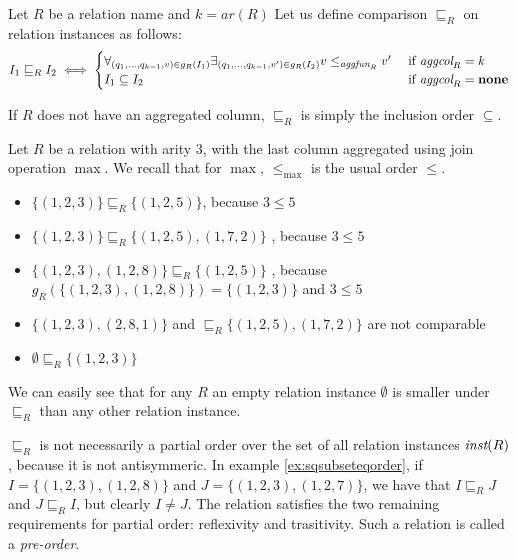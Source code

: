 \begin{defn}
Let $R$ be a relation name and $k=ar(R)$ Let us define comparison $\sqsubseteq_R$ on relation instances as follows:
$$
I_1 \sqsubseteq_R I_2 \iff
\begin{cases}
   \forall_{(q_1, ..., q_{k-1}, v) \in g_R(I_1)} \exists_{(q_1, ..., q_{k-1}, v') \in g_R(I_2)} v \le_{\textit{aggfun}_R} v' & \text{ if } \textit{aggcol}_R = k \\
   I_1 \subseteq I_2 & \text{ if } \textit{aggcol}_R = \bf{none} 
\end{cases}
$$
\end{defn}

\begin{rem}
If $R$ does not have an aggregated column, $\sqsubseteq_R$ is simply the inclusion order $\subseteq$. 
\end{rem}


\begin{exmp}
Let $R$ be a relation with arity $3$, with the last column aggregated using join operation $\max$.
We recall that for $ \max $, $ \le_{\max} $ is the usual order $ \le $.
\begin{itemize}
\item $\{(1, 2, 3)\} \sqsubseteq_R \{(1, 2, 5)\}$, because $3 \le 5$
\item $\{(1, 2, 3)\} \sqsubseteq_R \{(1, 2, 5), (1, 7, 2)\}$ , because $3 \le 5$
\item $\{(1, 2, 3), (1, 2, 8)\} \sqsubseteq_R \{(1, 2, 5)\}$ , because $g_R(\{(1, 2, 3), (1, 2, 8)\}) = \{(1,2,3)\}$ and $3 \le 5$
\item $\{(1, 2, 3), (2, 8, 1)\}$ and  $\sqsubseteq_R \{(1, 2, 5), (1, 7, 2)\}$ are not comparable
\item $\emptyset \sqsubseteq_R \{(1, 2, 3)\}$
\end{itemize}
\end{exmp}\label{ex:sqsubseteqorder}

We can easily see that for any $R$ an empty relation instance $\emptyset$ is smaller under $\sqsubseteq_R$  than any other relation instance.


$\sqsubseteq_R$ is not necessarily a partial order over the set of all relation instances $\textit{inst}(R)$, because it is not antisymmeric. In example \ref{ex:sqsubseteqorder}, if $I = \{(1, 2, 3), (1, 2, 8)\}$ and $J = \{(1, 2, 3), (1, 2, 7)\}$, we have that $I \sqsubseteq_R J$ and $J \sqsubseteq_R I$, but clearly $I \ne J$. The relation satisfies the two remaining requirements for partial order: reflexivity and trasitivity. Such a relation is called a \emph{pre-order}.

